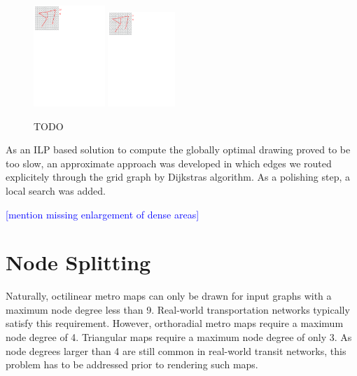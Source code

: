 \documentclass[sigconf]{acmart}
\newcommand\TODO[1]{\textcolor{blue}{\small [#1]}}
\begin{document}
\begin{figure}
    \centering
	\includegraphics[width=0.24\textwidth]{figures2/grid2.pdf}
	\hfill
	\includegraphics[width=0.2257\textwidth,trim=0 0 15 0, clip, page=2]{figures2/grid2.pdf}
	\caption{TODO}
	\label{FIG:griddrawing}
\end{figure}

As an ILP based solution to compute the globally optimal drawing proved to be too slow, an approximate approach was developed in which edges we routed explicitely through the grid graph by Dijkstras algorithm.
As a polishing step, a local search was added.

\TODO{mention missing enlargement of dense areas}

\section{Node Splitting}

Naturally, octilinear metro maps can only be drawn for input graphs with a maximum node degree less than 9.
Real-world transportation networks typically satisfy this requirement.
However, orthoradial metro maps require a maximum node degree of 4.
Triangular maps require a maximum node degree of only 3.
As node degrees larger than 4 are still common in real-world transit networks, this problem has to be addressed prior to rendering such maps.
\end{document}
